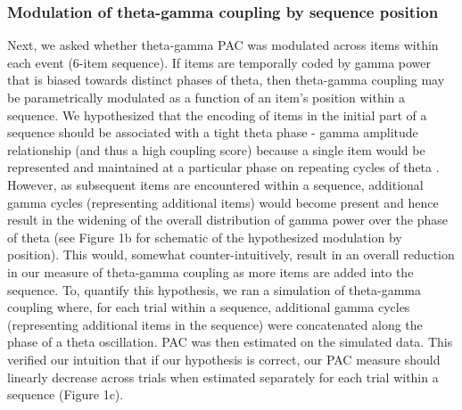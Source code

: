 \subsubsection{Modulation of theta-gamma coupling by sequence
position}\label{modulation-of-theta-gamma-coupling-by-sequence-position}

Next, we asked whether theta-gamma PAC was modulated across items within
each event (6-item sequence). If items are temporally coded by gamma
power that is biased towards distinct phases of theta, then theta-gamma
coupling may be parametrically modulated as a function of an item's
position within a sequence. We hypothesized that the encoding of items
in the initial part of a sequence should be associated with a tight
theta phase - gamma amplitude relationship (and thus a high coupling
score) because a single item would be represented and maintained at a
particular phase on repeating cycles of theta
\autocites{jensen_hippocampal_1996}{jensen_hippocampal_1996}. However,
as subsequent items are encountered within a sequence, additional gamma
cycles (representing additional items) would become present and hence
result in the widening of the overall distribution of gamma power over
the phase of theta (see Figure 1b for schematic of the hypothesized
modulation by position). This would, somewhat counter-intuitively,
result in an overall reduction in our measure of theta-gamma coupling as
more items are added into the sequence. To, quantify this hypothesis, we
ran a simulation of theta-gamma coupling where, for each trial within a
sequence, additional gamma cycles (representing additional items in the
sequence) were concatenated along the phase of a theta oscillation. PAC
was then estimated on the simulated data. This verified our intuition
that if our hypothesis is correct, our PAC measure should linearly
decrease across trials when estimated separately for each trial within a
sequence (Figure 1c).

